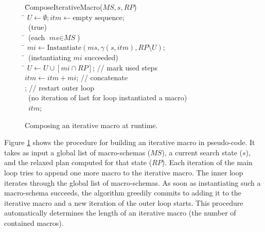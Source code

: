 \documentclass{article}
\begin{document}
\begin{figure}[t]
\begin{center}
\begin{minipage}[c]{\textwidth}
\footnotesize{
\begin{tabbing}
\hspace{0.0em} \= ComposeIterativeMacro($\textit{MS}, s, \textit{RP}$) \\ %
\> \quad \= $ U \leftarrow \emptyset; \textit{itm} \leftarrow \mbox{empty sequence}$; \\
\> \> \while \ (true) \\ %
\> \> \quad \= \for \ (each $\textit{ms} \in \textit{MS}$) \\ %
\> \> \> \quad \= $\textit{mi} \leftarrow \mbox{Instantiate}(\textit{ms}, \gamma(s, \textit{itm}), \textit{RP} \setminus U)$; \\
\> \> \> \quad \= \myif \ (instantiating $\textit{mi}$ succeeded) \\ %
\> \> \> \> \quad \=  $U \leftarrow U \cup [\textit{mi} \cap \textit{RP}]$; // mark used steps \\
\> \> \> \> \> $\textit{itm} \leftarrow \textit{itm} + \textit{mi}$; // concatenate \\
\> \> \> \> \> \break; // restart outer loop \\
\> \> \> \myif \ (no iteration of last for loop instantiated a macro) \\
\> \> \> \> \return \ $\textit{itm}$; %
\end{tabbing}
}
\end{minipage}
\end{center}
\caption{Composing an iterative macro at runtime.}
\label{fig:composition}
\end{figure}

Figure \ref{fig:composition} shows the procedure for building
an iterative macro in pseudo-code.
It takes as input a global list of macro-schemas ($\textit{MS}$),
a current search state ($s$),
and the relaxed plan computed for that state ($\textit{RP}$).
Each iteration of the main loop tries to append one more macro to the iterative macro.
The inner loop iterates through the global list of macro-schemas.
As soon as instantiating such a macro-schema succeeds, 
the algorithm greedily commits to adding it to the iterative macro
and a new iteration of the outer loop starts.
This procedure automatically determines
the length of an iterative macro (the number of contained macros).
\end{document}
